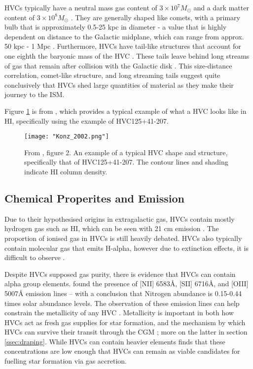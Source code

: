 HVCs typically have a neutral mass gas content of $3\times10^7 M_{\odot}$ and a dark matter content of $3\times10^8 M_{\odot}$ \citep{ID66}. They are generally shaped like comets, with a primary bulb that is approximately 0.5-25 kpc in diameter - a value that is highly dependent on distance to the Galactic midplane, which can range from approx. 50 kpc - 1 Mpc \citep{ID66, ID13}. Furthermore, HVCs have tail-like structures that account for one eighth the baryonic mass of the HVC \citep{ID13}. These tails leave behind long streams of gas that remain after collision with the Galactic disk \citep{ID19}. This size-distance correlation, comet-like structure, and long streaming tails suggest quite conclusively that HVCs shed large quantities of material as they make their journey to the ISM.


Figure \ref{fig:hvc_example} is from \cite{ID13}, which provides a typical example of what a HVC looks like in HI, specifically using the example of HVC125+41-207.

\begin{figure}
    \texttt{[image: "Konz\_2002.png"]}
    \centering
    \caption{From \cite{ID13}, figure 2. An example of a typical HVC shape and structure, specifically that of HVC125+41-207. The contour lines and shading indicate HI column density.}
    \label{fig:hvc_example}
\end{figure}

\subsection{Chemical Properites and Emission}
\label{ssec:chem}

Due to their hypothesised origins in extragalactic gas, HVCs contain mostly hydrogen gas such as HI, which can be seen with 21 cm emission \citep{ID7, ID8, ID6}. The proportion of ionised gas in HVCs is still heavily debated. HVCs also typically contain molecular gas that emits H-alpha, however due to extinction effects, it is difficult to observe \citep{ID9, ID43}.


Despite HVCs supposed gas purity, there is evidence that HVCs can contain alpha group elements. \cite{ID49, ID48} found the presence of [NII] 6583{\AA}, [SII] 6716{\AA}, and [OIII] 5007{\AA} emission lines – with a conclusion that Nitrogen abundance is 0.15-0.44 times solar abundance levels. The observation of these emission lines can help constrain the metallicity of any HVC  \citep{ID49}. Metallicity is important in both how HVCs act as fresh gas supplies for star formation, and the mechanism by which HVCs can survive their transit through the CGM \citep{ID24}; more on the latter in section \ref{ssec:draping}. While HVCs can contain heavier elements \cite{ID46} finds that these concentrations are low enough that HVCs can remain as viable candidates for fuelling star formation via gas accretion.


